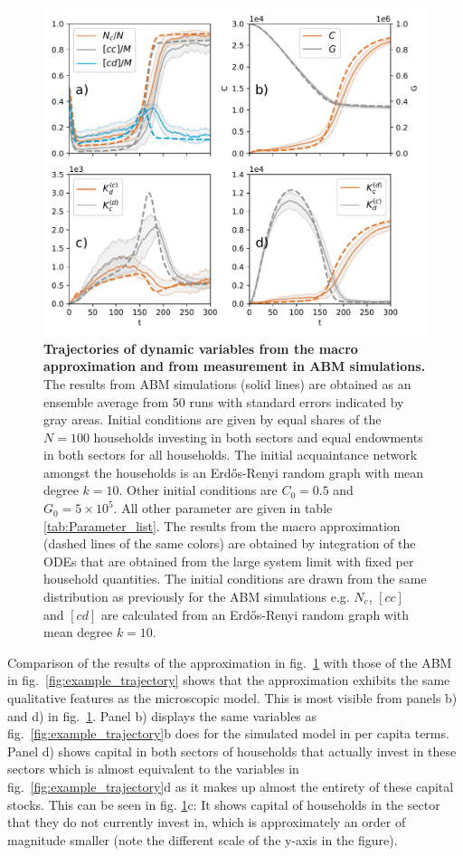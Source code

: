 \begin{figure}[ht!]
\centering\includegraphics[width=.9\linewidth]{figures/micro_vs_approx_v2_with_annotations.pdf}
\caption{\textbf{Trajectories of dynamic variables from the macro approximation and from measurement in ABM simulations.} The results from ABM simulations (solid lines) are obtained as an ensemble average from 50 runs with standard errors indicated by gray areas. Initial conditions are given by equal shares of the $N=100$ households investing in both sectors and equal endowments in both sectors for all households. The initial acquaintance network amongst the households is an Erd\H{o}s-Renyi random graph with mean degree $k=10$. Other initial conditions are $C_0=0.5$ and $G_0=5 \times 10^5$. All other parameter are given in table \ref{tab:Parameter_list}. The results from the macro approximation (dashed lines of the same colors) are obtained by integration of the ODEs that are obtained from the large system limit with fixed per household quantities. The initial conditions are drawn from the same distribution as previously for the ABM simulations e.g. $N_c$, $[cc]$ and $[cd]$ are calculated from an Erd\H{o}s-Renyi random graph with mean degree $k=10$.}
\label{fig:comparison2}
\end{figure}

Comparison of the results of the approximation in fig.~\ref{fig:comparison2} with those of the ABM in fig.~\ref{fig:example_trajectory} shows that the approximation exhibits the same qualitative features as the microscopic model.
This is most visible from panels b) and d) in fig.~\ref{fig:comparison2}. Panel b) displays the same variables as fig.~\ref{fig:example_trajectory}b does for the simulated model in per capita terms.
Panel d) shows capital in both sectors of households that actually invest in these sectors which is almost equivalent to the variables in fig.~\ref{fig:example_trajectory}d as it makes up almost the entirety of these capital stocks. This can be seen in fig. \ref{fig:comparison2}c: It shows capital of households in the sector that they do not currently invest in, which is approximately an order of magnitude smaller (note the different scale of the y-axis in the figure).

